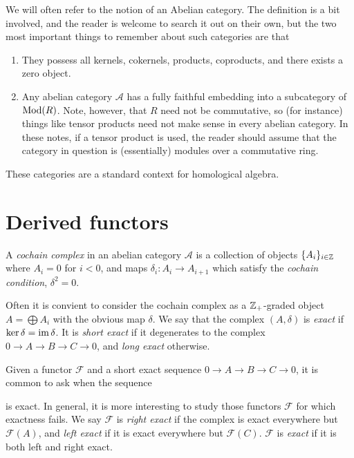 We will often refer to the notion of an Abelian category. The definition is a bit involved, and the reader is welcome to search it out on their own, but the two most important things to remember about such categories are that
\begin{enumerate}
    \item They possess all kernels, cokernels, products, coproducts, and there exists a zero object.
    \item Any abelian category $\mathcal{A}$ has a fully faithful embedding into a subcategory of $\operatorname{Mod}(R)$. Note, however, that $R$ need not be commutative, so (for instance) things like tensor products need not make sense in every abelian category. In these notes, if a tensor product is used, the reader should assume that the category in question is (essentially) modules over a commutative ring.
\end{enumerate}
These categories are a standard context for homological algebra.

\section{Derived functors}

\begin{definition}
    A \textit{cochain complex} in an abelian category $\mathcal{A}$ is a collection of objects $\{A_i\}_{i \in \mathbb{Z}}$ where $A_i = 0$ for $i < 0$, and maps $\delta_i : A_i \to A_{i+1}$ which satisfy the \textit{cochain condition}, $\delta^2 = 0$.
\end{definition}

Often it is convient to consider the cochain complex as a $\mathbb{Z}_+$-graded object $A = \bigoplus A_i$ with the obvious map $\delta$. We say that the complex $(A, \delta)$ is \textit{exact} if $\ker{\delta}=\operatorname{im}{\delta}$. It is \textit{short exact} if it degenerates to the complex $0 \to A \to B \to C \to 0$, and \textit{long exact} otherwise.

Given a functor $\mathcal{F}$ and a short exact sequence $0 \to A \to B \to C \to 0$, it is common to ask when the sequence
\begin{center}
\end{center}
is exact. In general, it is more interesting to study those functors $\mathcal{F}$ for which exactness fails. We say $\mathcal{F}$ is \textit{right exact} if the complex is exact everywhere but $\mathcal{F}(A)$, and \textit{left exact} if it is exact everywhere but $\mathcal{F}(C)$. $\mathcal{F}$ is \textit{exact} if it is both left and right exact.

